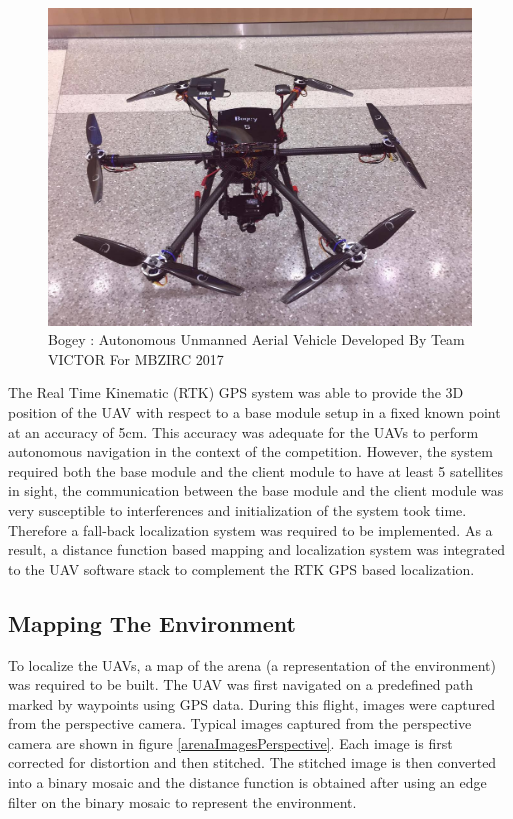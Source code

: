 \documentclass[12pt,a4paper]{report}
\begin{document}
\begin{figure}
	\centering
	\includegraphics[width=1.0\textwidth,clip=true,trim=17 50 5 17]{images/bogey.jpg}
	\caption{Bogey : Autonomous Unmanned Aerial Vehicle Developed By Team VICTOR For MBZIRC 2017\label{bogey}}
\end{figure}

The Real Time Kinematic (RTK) GPS system was able to provide the 3D position of the UAV with respect to a base module setup in a fixed known point at an accuracy of 5cm. This accuracy was adequate for the UAVs to perform autonomous navigation in the context of the competition. However, the system required both the base module and the client module to have at least 5 satellites in sight, the communication between the base module and the client module was very susceptible to interferences and initialization of the system took time. Therefore a fall-back localization system was required to be implemented. As a result, a distance function based mapping and localization system was integrated to the UAV software stack to complement the RTK GPS based localization.\par

\subsection{Mapping The Environment}
To localize the UAVs, a map of the arena (a representation of the environment) was required to be built. The UAV was first navigated on a predefined path marked by waypoints using GPS data. During this flight, images were captured from the perspective camera. Typical images captured from the perspective camera are shown in figure \ref{arenaImagesPerspective}. Each image is first corrected for distortion and then stitched. The stitched image is then converted into a binary mosaic and the distance function is obtained after using an edge filter on the binary mosaic to represent the environment.\par
\end{document}
